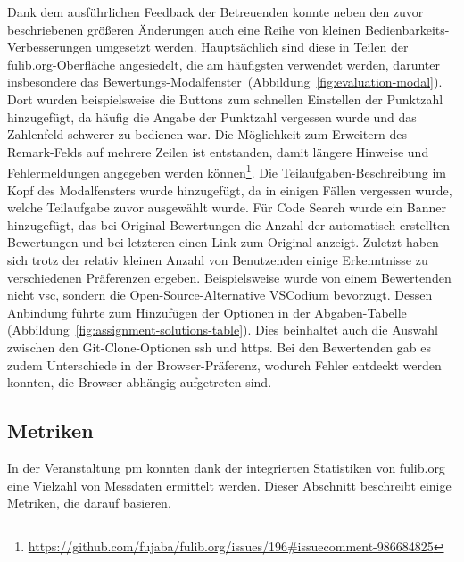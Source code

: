 Dank dem ausführlichen Feedback der Betreuenden konnte neben den zuvor beschriebenen größeren Änderungen auch eine Reihe von kleinen Bedienbarkeits-Verbesserungen umgesetzt werden.
Hauptsächlich sind diese in Teilen der fulib.org-Oberfläche angesiedelt, die am häufigsten verwendet werden, darunter insbesondere das Bewertungs-Modalfenster~(Abbildung~\ref{fig:evaluation-modal}).
Dort wurden beispielsweise die Buttons zum schnellen Einstellen der Punktzahl hinzugefügt, da häufig die Angabe der Punktzahl vergessen wurde und das Zahlenfeld schwerer zu bedienen war.
Die Möglichkeit zum Erweitern des Remark-Felds auf mehrere Zeilen ist entstanden, damit längere Hinweise und Fehlermeldungen angegeben werden können\footnote{\label{fn:nataschu-ha4}
    \url{https://github.com/fujaba/fulib.org/issues/196\#issuecomment-986684825}
}.
Die Teilaufgaben-Beschreibung im Kopf des Modalfensters wurde hinzugefügt, da in einigen Fällen vergessen wurde, welche Teilaufgabe zuvor ausgewählt wurde.
Für Code Search wurde ein Banner hinzugefügt, das bei Original-Bewertungen die Anzahl der automatisch erstellten Bewertungen und bei letzteren einen Link zum Original anzeigt.
Zuletzt haben sich trotz der relativ kleinen Anzahl von Benutzenden einige Erkenntnisse zu verschiedenen Präferenzen ergeben.
Beispielsweise wurde von einem Bewertenden nicht \ac{vsc}, sondern die Open-Source-Alternative VSCodium bevorzugt.
Dessen Anbindung führte zum Hinzufügen der Optionen in der Abgaben-Tabelle (Abbildung~\ref{fig:assignment-solutions-table}).
Dies beinhaltet auch die Auswahl zwischen den Git-Clone-Optionen \ac{ssh} und \ac{https}.
Bei den Bewertenden gab es zudem Unterschiede in der Browser-Präferenz, wodurch Fehler entdeckt werden konnten, die Browser-abhängig aufgetreten sind.

\subsection{Metriken}\label{subsec:pm-metrics}

In der Veranstaltung \ac{pm} konnten dank der integrierten Statistiken von fulib.org eine Vielzahl von Messdaten ermittelt werden.
Dieser Abschnitt beschreibt einige Metriken, die darauf basieren.

